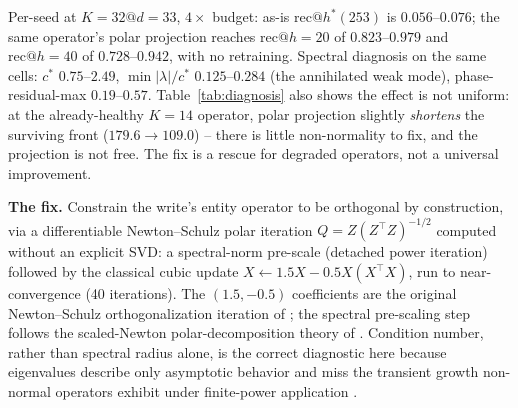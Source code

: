 Per-seed at $K{=}32@d{=}33$, $4\times$ budget: as-is $\mathrm{rec@}h^\ast(253)$
is $0.056$--$0.076$; the same operator's polar projection reaches
$\mathrm{rec@}h{=}20$ of $0.823$--$0.979$ and $\mathrm{rec@}h{=}40$ of
$0.728$--$0.942$, with no retraining. Spectral diagnosis on the same
cells: $c^\ast$ $0.75$--$2.49$, $\min|\lambda|/c^\ast$ $0.125$--$0.284$
(the annihilated weak mode), phase-residual-max $0.19$--$0.57$.
Table~\ref{tab:diagnosis} also shows the effect is not uniform: at the
already-healthy $K{=}14$ operator, polar projection slightly
\emph{shortens} the surviving front ($179.6 \to 109.0$) -- there is
little non-normality to fix, and the projection is not free. The fix is
a rescue for degraded operators, not a universal improvement.

\textbf{The fix.} Constrain the write's entity operator to be orthogonal
by construction, via a differentiable Newton--Schulz polar iteration
$Q = Z(Z^\top Z)^{-1/2}$ computed without an explicit SVD: a spectral-norm
pre-scale (detached power iteration) followed by the classical cubic
update $X \leftarrow 1.5X - 0.5X(X^\top X)$, run to near-convergence
(40 iterations). The $(1.5, -0.5)$ coefficients are the original
Newton--Schulz orthogonalization iteration of \citet{bjorck1971iterative};
the spectral pre-scaling step follows the scaled-Newton polar-decomposition
theory of \citet{higham1986computing}.
Condition number, rather than spectral radius alone, is the correct
diagnostic here because eigenvalues describe only asymptotic behavior and
miss the transient growth non-normal operators exhibit under finite-power
application \citep{trefethen2005spectra}.

